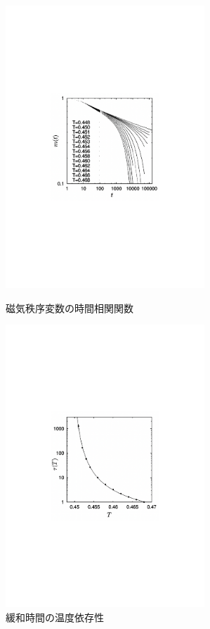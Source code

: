 \documentclass[12pt,titlepage,dvipdfmx]{jarticle}
\begin{document}
\begin{figure}[H]
   \begin{minipage}{0.5\hsize}
    \begin{center}
     \includegraphics[width=7.5cm]{figure/typical_Gt.pdf}
    \end{center}
    \caption{磁気秩序変数の時間相関関数}
   \end{minipage}
   \begin{minipage}{0.5\hsize}
    \begin{center}
     \includegraphics[width=7.5cm]{figure/typical_relaxation_time.pdf}
    \end{center}
    \caption{緩和時間の温度依存性}
   \end{minipage}
\end{figure}
\end{document}
